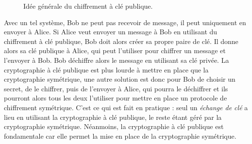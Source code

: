 \begin{figure}
  \caption{Idée générale du chiffrement à clé publique.}
  \label{fig:crypto-asym}
\end{figure}
Avec un tel système, Bob ne peut pas recevoir de message, il peut uniquement en
envoyer à Alice. Si Alice veut envoyer un message à Bob en utilisant du
chiffrement à clé publique, Bob doit alors créer sa propre paire de clé. Il
donne alors sa clé publique à Alice, qui peut l'utiliser pour chiffrer un
message et l'envoyer à Bob. Bob déchiffre alors le message en utilisant sa clé
privée. La cryptographie à clé publique est plus lourde à mettre en place que la
cryptographie symétrique, une autre solution est donc pour Bob de choisir un
secret, de le chiffrer, puis de l'envoyer à Alice, qui pourra le déchiffrer et
ils pourront alors tous les deux l'utiliser pour mettre en place un protocole de
chiffrement symétrique. C'est ce qui est fait en pratique : seul un
\emph{échange de clé} a lieu en utilisant la cryptographie à clé publique, le
reste étant géré par la cryptographie symétrique. Néanmoins, la cryptographie à
clé publique est fondamentale car elle permet la mise en place de la
cryptographie symétrique.

